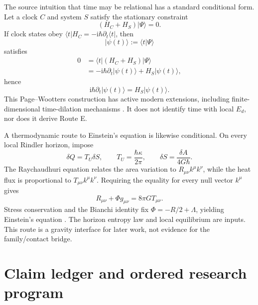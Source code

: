 \documentclass[11pt]{article}
\numberwithin{equation}{section}
\newcommand{\ii}{\mathrm i}
\begin{document}
The source intuition that time may be relational has a standard conditional
form.  Let a clock \(C\) and system \(S\) satisfy the stationary constraint
\begin{equation}
 (H_C+H_S)|\Psi\rangle=0.
\end{equation}
If clock states obey \(\langle t|H_C=-\ii\hbar\partial_t\langle t|\), then
\begin{equation}
 |\psi(t)\rangle:=\langle t|\Psi\rangle
\end{equation}
satisfies
\begin{align}
 0&=\langle t|(H_C+H_S)|\Psi\rangle\\
 &=-\ii\hbar\partial_t|\psi(t)\rangle+H_S|\psi(t)\rangle,
\end{align}
hence
\begin{equation}
 \ii\hbar\partial_t|\psi(t)\rangle=H_S|\psi(t)\rangle.
 \label{eq:PW}
\end{equation}
This Page--Wootters construction \cite{PageWootters1983} has active modern
extensions, including finite-dimensional time-dilation mechanisms
\cite{Cafasso2024}.  It does not identify time with local \(E_d\), nor does it
derive Route E.

A thermodynamic route to Einstein's equation is likewise conditional.  On
every local Rindler horizon, impose
\begin{equation}
 \delta Q=T_U\delta S,\qquad
 T_U=\frac{\hbar\kappa}{2\pi},\qquad
 \delta S=\frac{\delta A}{4G\hbar}.
\end{equation}
The Raychaudhuri equation relates the area variation to
\(R_{\mu\nu}k^\mu k^\nu\), while the heat flux is proportional to
\(T_{\mu\nu}k^\mu k^\nu\).  Requiring the equality for every null vector
\(k^\mu\) gives
\begin{equation}
 R_{\mu\nu}+\Phi g_{\mu\nu}=8\pi G T_{\mu\nu}.
\end{equation}
Stress conservation and the Bianchi identity fix
\(\Phi=-R/2+\Lambda\), yielding Einstein's equation
\cite{Jacobson1995,Jacobson2016}.  The horizon entropy law and local
equilibrium are inputs.  This route is a gravity interface for later work,
not evidence for the family/contact bridge.

\section{Claim ledger and ordered research program}
\end{document}
